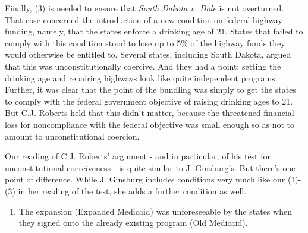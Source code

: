 \documentclass[
  11pt,
  letterpaper,
  DIV=11,
  numbers=noendperiod,
  oneside]{scrartcl}
\providecommand{\tightlist}{%
  \setlength{\itemsep}{0pt}\setlength{\parskip}{0pt}}\usepackage{longtable,booktabs,array}
\begin{document}
Finally, (3) is needed to ensure that \emph{South Dakota v. Dole} is not
overturned. That case concerned the
introduction of a new condition on federal highway funding, namely, that
the states enforce a drinking age of 21. States that failed to comply
with this condition stood to lose up to 5\% of the highway funds they
would otherwise be entitled to. Several states, including South Dakota,
argued that this was unconstitutionally coercive. And they had a point;
setting the drinking age and repairing highways look like quite
independent programs. Further, it was clear that the point of the
bundling was simply to get the states to comply with the federal
government objective of raising drinking ages to 21. But C.J. Roberts
held that this didn't matter, because the threatened financial loss for
noncompliance with the federal objective was small enough so as not to
amount to unconstitutional coercion.

Our reading of C.J. Roberts' argument - and in particular, of his test
for unconstitutional coerciveness - is quite similar to J.
Ginsburg's. But
there's one point of difference. While J. Ginsburg includes conditions
very much like our (1)-(3) in her reading of the test, she adds a
further condition as well.

\begin{enumerate}
\def\labelenumi{\arabic{enumi}.}
\setcounter{enumi}{3}
\tightlist
\item
  The expansion (Expanded Medicaid) was unforeseeable by the states when
  they signed onto the already existing program (Old
  Medicaid).
\end{enumerate}
\end{document}
